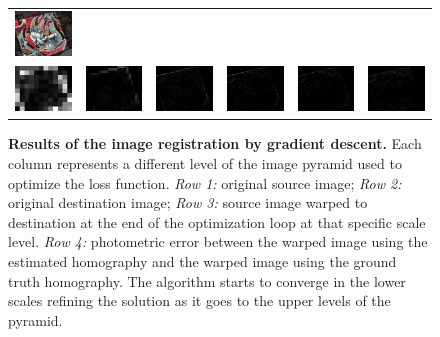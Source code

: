\begin{figure}
\begin{center}
\begin{tabular}{c c c c c c}
        \includegraphics[width=1.8cm]{main/chapter03/data/homography/img_src_to_dst_7.jpg} \\
        \includegraphics[width=1.8cm]{main/chapter03/data/homography/error_1.jpg} &
        \includegraphics[width=1.8cm]{main/chapter03/data/homography/error_2.jpg} &
        \includegraphics[width=1.8cm]{main/chapter03/data/homography/error_3.jpg} &
        \includegraphics[width=1.8cm]{main/chapter03/data/homography/error_4.jpg} &
        \includegraphics[width=1.8cm]{main/chapter03/data/homography/error_5.jpg} &
        \includegraphics[width=1.8cm]{main/chapter03/data/homography/error_7.jpg} \\
        \end{tabular}
    \end{center}
    \caption{{\bf Results of the image registration by gradient descent.} Each  column represents a different level of the image pyramid used to optimize the loss function. \textit{Row 1:}  original source image; \textit{Row 2:}  original destination image; \textit{Row 3:}  source image warped to destination at the end of the optimization loop at that specific scale level.\textit{ Row 4:}  photometric error between the warped image using the estimated homography and the warped image using the ground truth homography. The algorithm starts to converge in the lower scales refining the solution as it goes to the upper levels of the pyramid.}
    \label{fig:homography_pyramid}
\end{figure}

